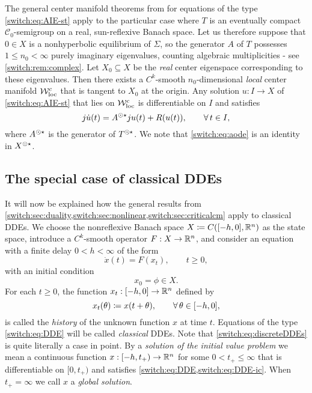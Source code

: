 The general center manifold theorems from \cite[Chapter IX]{diekmann1995delay} for equations of the type \cref{switch:eq:AIE-st} apply to the particular case where $T$ is an eventually compact $\mathcal{C}_0$-semigroup on a real, sun-reflexive Banach space. Let us therefore suppose that $0 \in X$ is a nonhyperbolic equilibrium of $\Sigma$, so the generator $A$ of $T$ possesses $1 \le n_0 < \infty$ purely imaginary eigenvalues, counting algebraic multiplicities - see \cref{switch:rem:complex}. Let $X_0 \subseteq X$ be the \emph{real} center eigenspace corresponding to these eigenvalues. Then there exists a $C^k$-smooth $n_0$-dimensional \emph{local} center manifold $\mathcal{W}^c_{\text{loc}}$ that is tangent to $X_0$ at the origin. Any solution $u : I \to X$ of \cref{switch:eq:AIE-st} that lies on $\mathcal{W}^c_{\text{loc}}$ is differentiable on $I$ and satisfies
%
\begin{equation}
  \label{switch:eq:aode}
  j\dot{u}(t) = A^{\odot\star}j u(t) + R(u(t)), \qquad \forall\,t \in I,
\end{equation}
%
where $A^{\odot\star}$ is the {\WSTAR} generator of $T^{\odot\star}$. We note that \cref{switch:eq:aode} is an identity in $X^{\odot\star}$.

\subsection{The special case of classical DDEs}\label{switch:sec:ddecase}
It will now be explained how the general results from \cref{switch:sec:duality,switch:sec:nonlinear,switch:sec:criticalcm} apply to classical DDEs. We choose the nonreflexive Banach space $X \coloneqq C([-h,0],\mathbb{R}^n)$ as the state space, introduce a $C^k$-smooth operator $F:X \to \mathbb{R}^n$, and consider an equation with a finite delay $0 < h < \infty$ of the form
%
\begin{equation}
  \label{switch:eq:DDE}\tag{DDE}
  \dot{x}(t)=F(x_t), \qquad t \ge 0,
\end{equation}
%
with an initial condition
%
\begin{equation}
  \label{switch:eq:DDE-ic}\tag{IC}
  x_0 = \phi \in X.
\end{equation}
%
For each $t \ge 0$, the function $x_t : [-h,0] \to \mathbb{R}^n$ defined by
\[
  x_t(\theta) \coloneqq x(t + \theta), \qquad \forall\,\theta \in [-h,0],
\]
%
is called the \emph{history} of the unknown function $x$ at time $t$. Equations of the type \cref{switch:eq:DDE} will be called \emph{classical} DDEs. Note that \cref{switch:eq:discreteDDEs} is quite literally a case in point. By a \emph{solution of the initial value problem}  we mean a continuous function $x : [-h,t_+) \to \mathbb{R}^n$ for some $0 < t_+ \le \infty$ that is differentiable on $[0,t_+)$ and satisfies \cref{switch:eq:DDE,switch:eq:DDE-ic}. When $t_+ = \infty$ we call $x$ a \emph{global solution}.

